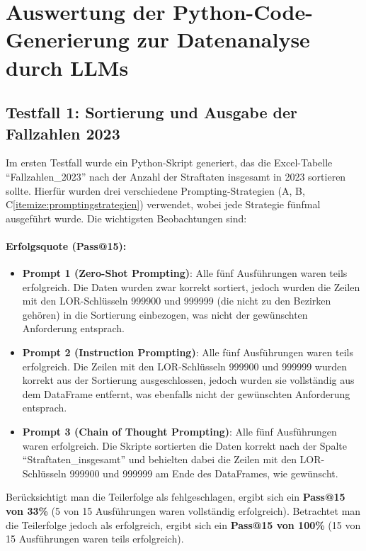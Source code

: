 \documentclass[11pt,a4paper]{article}
\begin{document}
\section{Auswertung der Python-Code-Generierung zur Datenanalyse durch LLMs}
\label{sec:auswertung}
\subsection{Testfall 1: Sortierung und Ausgabe der Fallzahlen 2023}
\label{subsec:auswertung_testfall1 }
    
Im ersten Testfall wurde ein Python-Skript generiert, das die Excel-Tabelle \enquote{Fallzahlen\_2023} nach der Anzahl der Straftaten insgesamt in 2023 sortieren sollte. Hierfür wurden drei verschiedene Prompting-Strategien (A, B, C\ref{itemize:promptingstrategien}) verwendet, wobei jede Strategie fünfmal ausgeführt wurde. Die wichtigsten Beobachtungen sind:
    
\paragraph{Erfolgsquote (Pass@15):}
\begin{itemize}
    \item \textbf{Prompt 1 (Zero-Shot Prompting)}: Alle fünf Ausführungen waren teils erfolgreich. Die Daten wurden zwar korrekt sortiert, jedoch wurden die Zeilen mit den LOR-Schlüsseln 999900 und 999999 (die nicht zu den Bezirken gehören) in die Sortierung einbezogen, was nicht der gewünschten Anforderung entsprach.
    \item \textbf{Prompt 2 (Instruction Prompting)}: Alle fünf Ausführungen waren teils erfolgreich. Die Zeilen mit den LOR-Schlüsseln 999900 und 999999 wurden korrekt aus der Sortierung ausgeschlossen, jedoch wurden sie vollständig aus dem DataFrame entfernt, was ebenfalls nicht der gewünschten Anforderung entsprach.
    \item \textbf{Prompt 3 (Chain of Thought Prompting)}: Alle fünf Ausführungen waren erfolgreich. Die Skripte sortierten die Daten korrekt nach der Spalte \enquote{Straftaten\_insgesamt} und behielten dabei die Zeilen mit den LOR-Schlüsseln 999900 und 999999 am Ende des DataFrames, wie gewünscht.
\end{itemize}
Berücksichtigt man die Teilerfolge als fehlgeschlagen, ergibt sich ein \textbf{Pass@15 von 33\%} (5 von 15 Ausführungen waren vollständig erfolgreich). Betrachtet man die Teilerfolge jedoch als erfolgreich, ergibt sich ein \textbf{Pass@15 von 100\%} (15 von 15 Ausführungen waren teils erfolgreich).
    
\end{document}
